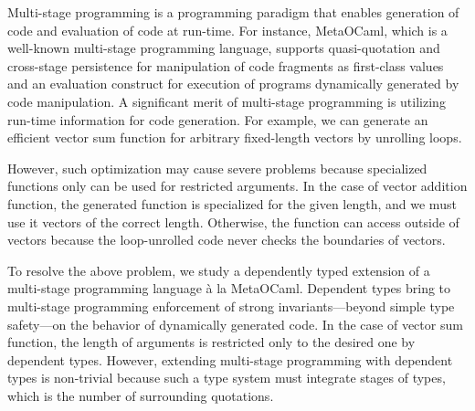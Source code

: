 \documentclass[master,english]{kuisthesis}
\begin{document}
\date{February 15, 2020}			%

\maketitle

\begin{eabstract}


Multi-stage programming is a programming paradigm that enables generation of
code and evaluation of code at run-time. For instance, MetaOCaml, which is
a well-known multi-stage programming language, supports quasi-quotation and
cross-stage persistence for manipulation of code fragments as first-class
values and an evaluation construct for execution of programs dynamically
generated by code manipulation. A significant merit of multi-stage
programming is utilizing run-time information for code generation. For
example, we can generate an efficient vector sum function for arbitrary
fixed-length vectors by unrolling loops.


However, such optimization may cause severe problems because specialized
functions only can be used for restricted arguments. In the case of vector
addition function, the generated function is specialized for the given
length, and we must use it vectors of the correct length. Otherwise, the
function can access outside of vectors because the loop-unrolled code never
checks the boundaries of vectors.


To resolve the above problem, we study a dependently typed extension of a
multi-stage programming language \`a la MetaOCaml. Dependent types bring to
multi-stage programming enforcement of strong invariants---beyond simple
type safety---on the behavior of dynamically generated code. In the case of
vector sum function, the length of arguments is restricted only to the
desired one by dependent types. However, extending multi-stage programming
with dependent types is non-trivial because such a type system must
integrate stages of types, which is the number of surrounding quotations.


\end{eabstract}
\end{document}
